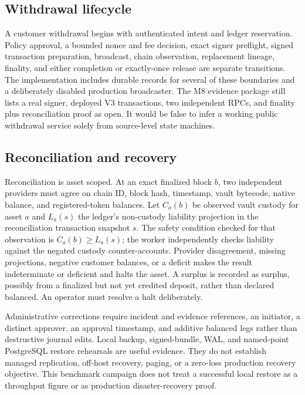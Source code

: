 \documentclass[envcountsame,runningheads,notitlepage]{llncs}
\begin{document}
\subsection{Withdrawal lifecycle}
A customer withdrawal begins with authenticated intent and ledger reservation. Policy approval, a bounded nonce and fee decision, exact signer preflight, signed transaction preparation, broadcast, chain observation, replacement lineage, finality, and either completion or exactly-once release are separate transitions. The implementation includes durable records for several of these boundaries and a deliberately disabled production broadcaster. The M8 evidence package still lists a real signer, deployed V3 transactions, two independent RPCs, and finality plus reconciliation proof as open. It would be false to infer a working public withdrawal service solely from source-level state machines.\cite{m8}

\subsection{Reconciliation and recovery}
Reconciliation is asset scoped. At an exact finalized block $b$, two independent providers must agree on chain ID, block hash, timestamp, vault bytecode, native balance, and registered-token balances. Let $C_a(b)$ be observed vault custody for asset $a$ and $L_a(s)$ the ledger's non-custody liability projection in the reconciliation transaction snapshot $s$. The safety condition checked for that observation is $C_a(b)\ge L_a(s)$; the worker independently checks liability against the negated custody counter-accounts. Provider disagreement, missing projections, negative customer balances, or a deficit makes the result indeterminate or deficient and halts the asset. A surplus is recorded as surplus, possibly from a finalized but not yet credited deposit, rather than declared balanced. An operator must resolve a halt deliberately.\cite{source}

Administrative corrections require incident and evidence references, an initiator, a distinct approver, an approval timestamp, and additive balanced legs rather than destructive journal edits. Local backup, signed-bundle, WAL, and named-point PostgreSQL restore rehearsals are useful evidence. They do not establish managed replication, off-host recovery, paging, or a zero-loss production recovery objective. This benchmark campaign does not treat a successful local restore as a throughput figure or as production disaster-recovery proof.\cite{adrs,m8}
\end{document}
